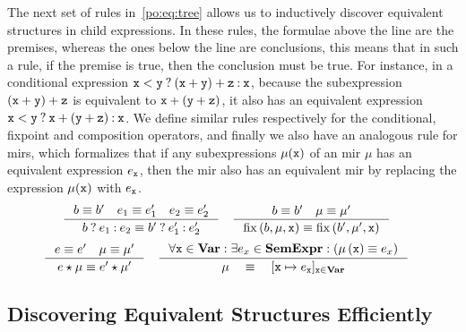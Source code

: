 The next set of rules in~\eqref{po:eq:tree} allows us to inductively discover
equivalent structures in child expressions.  In these rules, the formulae above
the line are the premises, whereas the ones below the line are conclusions,
this means that in such a rule, if the premise is true, then the conclusion
must be true.  For instance, in a conditional expression $\texttt{x} <
\texttt{y}\mathbin{?}(\texttt{x} + \texttt{y}) + \texttt{z}\mathbin{:}\texttt{x}$, because the subexpression $(\texttt{x}
+ \texttt{y}) + \texttt{z}$ is equivalent to $\texttt{x} + (\texttt{y} + \texttt{z})$, it also
has an equivalent expression $\texttt{x} < \texttt{y}\mathbin{?}\texttt{x} + (\texttt{y} +
\texttt{z})\mathbin{:}\texttt{x}$.  We define similar rules respectively for the conditional,
fixpoint and composition operators, and finally we also have an analogous rule
for \glspl{mir}, which formalizes that if any subexpressions $\mu(\texttt{x})$ of
an \gls{mir} $\mu$ has an equivalent expression $e_{\texttt{x}}$, then the \gls{mir}
also has an equivalent \gls{mir} by replacing the expression $\mu(\texttt{x})$ with
$e_{\texttt{x}}$.
\begin{equation}
    \begin{aligned}
        \inference{%
            b \eqrel b^\prime \quad
            e_1 \eqrel e^\prime_1 \quad
            e_2 \eqrel e^\prime_2
        }{%
            \select{b}{e_1}{e_2} \eqrel
            \select{b^\prime}{e^\prime_1}{e^\prime_2}
        }
        & \quad
        \inference{%
            b \eqrel b^\prime \quad
            \mu \eqrel \mu^\prime
        }{%
            \fix\left(b, \mu, \varx\right) \eqrel
            \fix\left(b^\prime, \mu^\prime, \varx\right)
        }
    \end{aligned}
    \nonumber
\end{equation}
\vspace{-10pt}
\begin{equation}
    \begin{aligned}
        \inference{%
            e \eqrel e^\prime \quad
            \mu \eqrel \mu^\prime
        }{%
            e \expand \mu \eqrel e^\prime \expand \mu^\prime
        }
        & \quad
        \inference{%
            \forall \varx \in \varset:
            \exists e_x \in \sexprset:
            \left( \mu\left(\varx\right) \eqrel e_x \right)
        }{%
            \mu \quad \eqrel \quad [\varx \mapsto e_\varx]_{\varx \in \varset}
        }
    \end{aligned}
    \label{po:eq:tree}
\end{equation}


\subsection{Discovering Equivalent Structures Efficiently}
\label{po:sub:discovering}

